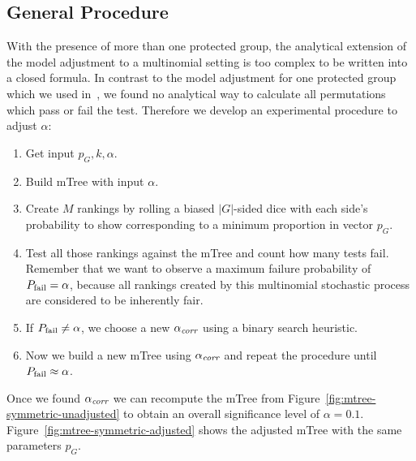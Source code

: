 \subsection{General Procedure}
\label{subsec:general-process}
%
With the presence of more than one protected group, the analytical extension of the model adjustment to a multinomial setting is too complex to be written into a closed formula.
%
In contrast to the model adjustment for one protected group which we used in~\cite{zehlike2017fair},
we found no analytical way to calculate all permutations which pass or fail the test.
%
Therefore we develop an experimental procedure to adjust $ \alpha $:
%
\begin{enumerate}
	\item Get input $ p_G, k, \alpha $.
	\item Build mTree with input $ \alpha $.
	\item Create $M$ rankings by rolling a biased $ |G| $-sided dice with each side's probability to show corresponding to a minimum proportion in vector $ p_G $.
	\item Test all those rankings against the mTree and count how many tests fail.
	Remember that we want to observe a maximum failure probability of $ P_{\operatorname{fail}}=\alpha $, because all rankings created by this multinomial stochastic process are considered to be inherently fair.
	\item If $ P_{\operatorname{fail}} \neq \alpha $, we choose a new $ \alpha_\textit{corr} $ using a binary search heuristic.
	\item Now we build a new mTree using $ \alpha_\textit{corr} $ and repeat the procedure until $ P_{\operatorname{fail}} \approx \alpha $.
\end{enumerate}
%
Once we found $\alpha_\textit{corr}$ we can recompute the mTree from Figure~\ref{fig:mtree-symmetric-unadjusted} %
 to obtain an overall significance level of $\alpha = 0.1$.
%
Figure~\ref{fig:mtree-symmetric-adjusted}
shows the adjusted mTree with the same parameters $p_G$.


